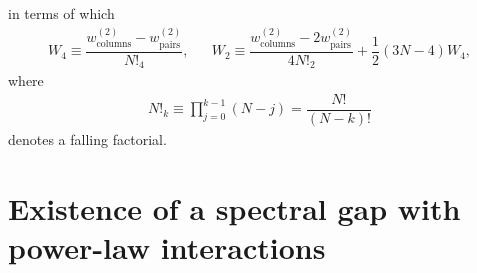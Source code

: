 \documentclass[nofootinbib,notitlepage,11pt]{revtex4-2}
\renewcommand{\t}{\text} %
\newcommand{\f}[2]{\dfrac{#1}{#2}} %
\newcommand{\p}[1]{\left(#1\right)} %
\newcommand{\1}{\mathds{1}}
\begin{document}
in terms of which
\begin{align}
  W_4 \equiv \f{w_{\t{columns}}^{(2)} - w_{\t{pairs}}^{(2)}}{N!_4},
  &&
  W_2 \equiv \f{w_{\t{columns}}^{(2)} - 2 w_{\t{pairs}}^{(2)}}
  {4N!_2} + \f12 \p{3N-4} W_4,
\end{align}
where
\begin{align}
  N!_k \equiv \prod_{j=0}^{k-1} \p{N-j} = \f{N!}{\p{N-k}!}
\end{align}
denotes a falling factorial.

\newpage
\appendix

\section{Existence of a spectral gap with power-law interactions}
\label{sec:gap}
\end{document}
